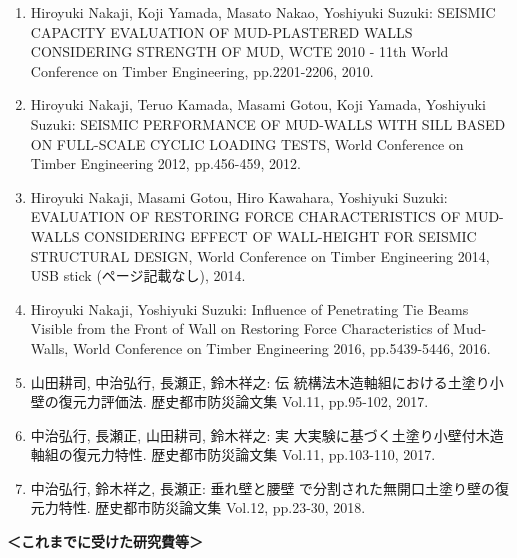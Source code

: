 \documentclass[11pt,a4paper,uplatex,dvipdfmx]{ujarticle} 		%
\newcommand{\研究課題名}{伝統的な木造土塗り壁の復元力に及ぼす軸組の影響に関する実験研究}
\newcommand{\研究機関名}{公立鳥取環境大学}
\newcommand{\研究代表者氏名}{中治弘行}
\newcommand{\me}{{Hiroyuki Nakaji}}
\newcommand{\私}{{\研究代表者氏名}}
\newcommand{\研究期間の最終元号年度}{8}  %
\begin{document}
\begin{enumerate}
\item \label{pub:wcte2010}
  \me{}, Koji Yamada, Masato Nakao, Yoshiyuki Suzuki: 
  SEISMIC CAPACITY EVALUATION OF MUD-PLASTERED
  WALLS CONSIDERING STRENGTH OF MUD, 
  WCTE 2010 - 11th World
  Conference on Timber Engineering, pp.2201-2206, 2010. %


\item \label{pub:wcte2012}
  \me{}, Teruo Kamada, Masami Gotou, Koji Yamada,
  Yoshiyuki Suzuki:
  SEISMIC PERFORMANCE OF MUD-WALLS WITH SILL BASED ON FULL-SCALE
  CYCLIC LOADING TESTS,
  World Conference on Timber Engineering 2012, pp.456-459, 2012. %


\item \label{pub:wcte2014} \me{}, Masami Gotou, Hiro Kawahara, Yoshiyuki
  Suzuki: EVALUATION OF RESTORING FORCE CHARACTERISTICS OF MUD-WALLS
  CONSIDERING EFFECT OF WALL-HEIGHT FOR SEISMIC STRUCTURAL DESIGN, World
  Conference on Timber Engineering 2014, USB stick (ページ記載なし),
  2014. %


\item \label{pub:wcte2016} 
  \me{}, Yoshiyuki Suzuki:
  Influence of Penetrating Tie Beams Visible from the Front of
  Wall on Restoring Force Characteristics of Mud-Walls,
  World Conference on Timber Engineering 2016, pp.5439-5446, 2016. %


\item \label{pub:rekibo2017-yamada} 山田耕司, \私{}, 長瀬正, 鈴木祥之: 伝
  統構法木造軸組における土塗り小壁の復元力評価法. 歴史都市防災論文集
  Vol.11, pp.95-102, 2017. %
  
\item \label{pub:rekibo2017-nakaji} \私{}, 長瀬正, 山田耕司, 鈴木祥之: 実
  大実験に基づく土塗り小壁付木造軸組の復元力特性. 歴史都市防災論文集
  Vol.11, pp.103-110, 2017. %
  
\item \label{pub:rekibo2018-nakaji} \私{}, 鈴木祥之, 長瀬正: 垂れ壁と腰壁
  で分割された無開口土塗り壁の復元力特性. 歴史都市防災論文集 Vol.12,
  pp.23-30, 2018. %

	\end{enumerate}
{\parindent=0pt
  \textbf{＜これまでに受けた研究費等＞}}
\end{document}
